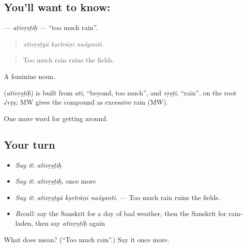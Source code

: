 \subsection*{You'll want to know: }
\textbf{} — \emph{ativṛṣṭiḥ} — \textquotedblleft{}too much rain\textquotedblright{}.

\begin{quote}
  
\end{quote}

\begin{quote}
\emph{ativṛṣṭyā kṣetrāṇi naśyanti.}
\end{quote}

\begin{quote}
Too much rain ruins the fields.
\end{quote}

A feminine noun.

\begin{cousinweb}
\textbf{} (\emph{ativṛṣṭiḥ}) is built from \emph{ati}, \textquotedblleft{}beyond, too much\textquotedblright{}, and \emph{vṛṣṭi}, \textquotedblleft{}rain\textquotedblright{}, on the root √vṛṣ; MW gives the compound as excessive rain (MW).
\end{cousinweb}

\begin{grammarlens}[title={What you've built}]
One more word for getting around.
\end{grammarlens}

\subsection*{Your turn}
\begin{itemize}
\raggedright
  \item \emph{Say it:} \emph{ativṛṣṭiḥ}
  \item \emph{Say it:} \emph{ativṛṣṭiḥ}, once more
  \item \emph{Say it:} \emph{ativṛṣṭyā kṣetrāṇi naśyanti.} — Too much rain ruins the fields.
  \item \emph{Recall:} say the Sanskrit for a day of bad weather, then the Sanskrit for rain-laden, then say \emph{ativṛṣṭiḥ} again
\end{itemize}

\begin{tcolorbox}[breakable,colback=teal!4,colframe=teal!35!black,title={Before you move on}]
What does  mean? (\textquotedblleft{}Too much rain\textquotedblright{}.) Say it once more.
\end{tcolorbox}
